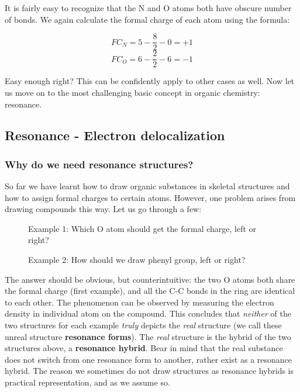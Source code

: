 \documentclass{report}
\begin{document}
		It is fairly easy to recognize that the N and O atoms both have obscure number of bonds. We again calculate the formal charge of each atom using the formula:
			
			\[FC_N = 5 - \frac{8}{2} - 0 = +1\]
			\[FC_O = 6 - \frac{2}{2} - 6 = -1\]
		
		Easy enough right? This can be confidently apply to other cases as well. Now let us move on to the most challenging basic concept in organic chemistry: resonance.
		
		\subsection{Resonance - Electron delocalization}
			\subsubsection{Why do we need resonance structures?}
		So far we have learnt how to draw organic substances in skeletal structures and how to assign formal charges to certain atoms. However, one problem arises from drawing compounds this way. Let us go through a few:
		 \begin{figure}[H]
		 \centering
		 \captionsetup{justification=centering, margin=2cm}
		 	 \qquad
		\caption{Example 1: Which O atom should get the formal charge, left or right?}	
		 \end{figure}
		
		\begin{figure}[H]
		 \centering
		 \captionsetup{justification=centering, margin=2cm}
		 	 \qquad
		\caption{Example 2: How should we draw phenyl group, left or right?}	
		 \end{figure}
		
		The answer should be obvious, but counterintuitive: the two O atoms both share the formal charge (first example), and all the C-C bonds in the ring are identical to each other. The phenomenon can be observed by measuring the electron density in individual atom on the compound. This concludes that \textit{neither} of the two structures for each example \textit{truly} depicts the \textit{real} structure (we call these unreal structure \textbf{resonance forms}). The \textit{real} structure is the hybrid of the two structures above, a \textbf{resonance hybrid}. Bear in mind that the real substance does not switch from one resonance form to another, rather exist as a resonance hybrid. The reason we sometimes do not draw structures as resonance hybrids is practical representation, and as we assume so.
\end{document}
